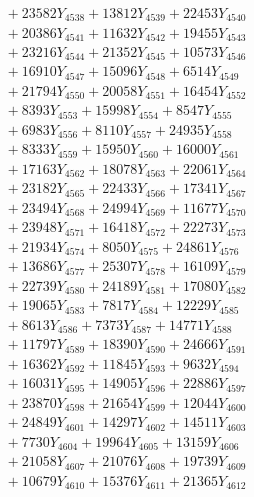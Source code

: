 \documentclass[a4paper,10pt]{article}
\begin{document}
{\begin{align}
&\;  + 23582 Y_{4538} + 13812 Y_{4539} + 22453 Y_{4540} \\[0.3ex]
&\;  + 20386 Y_{4541} + 11632 Y_{4542} + 19455 Y_{4543} \\[0.3ex]
&\;  + 23216 Y_{4544} + 21352 Y_{4545} + 10573 Y_{4546} \\[0.3ex]
&\;  + 16910 Y_{4547} + 15096 Y_{4548} + 6514 Y_{4549} \\[0.3ex]
&\;  + 21794 Y_{4550} + 20058 Y_{4551} + 16454 Y_{4552} \\[0.3ex]
&\;  + 8393 Y_{4553} + 15998 Y_{4554} + 8547 Y_{4555} \\[0.3ex]
&\;  + 6983 Y_{4556} + 8110 Y_{4557} + 24935 Y_{4558} \\[0.5ex]\allowbreak
&\;  + 8333 Y_{4559} + 15950 Y_{4560} + 16000 Y_{4561} \\[0.3ex]
&\;  + 17163 Y_{4562} + 18078 Y_{4563} + 22061 Y_{4564} \\[0.3ex]
&\;  + 23182 Y_{4565} + 22433 Y_{4566} + 17341 Y_{4567} \\[0.3ex]
&\;  + 23494 Y_{4568} + 24994 Y_{4569} + 11677 Y_{4570} \\[0.3ex]
&\;  + 23948 Y_{4571} + 16418 Y_{4572} + 22273 Y_{4573} \\[0.3ex]
&\;  + 21934 Y_{4574} + 8050 Y_{4575} + 24861 Y_{4576} \\[0.3ex]
&\;  + 13686 Y_{4577} + 25307 Y_{4578} + 16109 Y_{4579} \\[0.3ex]
&\;  + 22739 Y_{4580} + 24189 Y_{4581} + 17080 Y_{4582} \\[0.3ex]
&\;  + 19065 Y_{4583} + 7817 Y_{4584} + 12229 Y_{4585} \\[0.3ex]
&\;  + 8613 Y_{4586} + 7373 Y_{4587} + 14771 Y_{4588} \\[0.5ex]\allowbreak
&\;  + 11797 Y_{4589} + 18390 Y_{4590} + 24666 Y_{4591} \\[0.3ex]
&\;  + 16362 Y_{4592} + 11845 Y_{4593} + 9632 Y_{4594} \\[0.3ex]
&\;  + 16031 Y_{4595} + 14905 Y_{4596} + 22886 Y_{4597} \\[0.3ex]
&\;  + 23870 Y_{4598} + 21654 Y_{4599} + 12044 Y_{4600} \\[0.3ex]
&\;  + 24849 Y_{4601} + 14297 Y_{4602} + 14511 Y_{4603} \\[0.3ex]
&\;  + 7730 Y_{4604} + 19964 Y_{4605} + 13159 Y_{4606} \\[0.3ex]
&\;  + 21058 Y_{4607} + 21076 Y_{4608} + 19739 Y_{4609} \\[0.3ex]
&\;  + 10679 Y_{4610} + 15376 Y_{4611} + 21365 Y_{4612} \\[0.3ex]

\end{align}}
\end{document}
